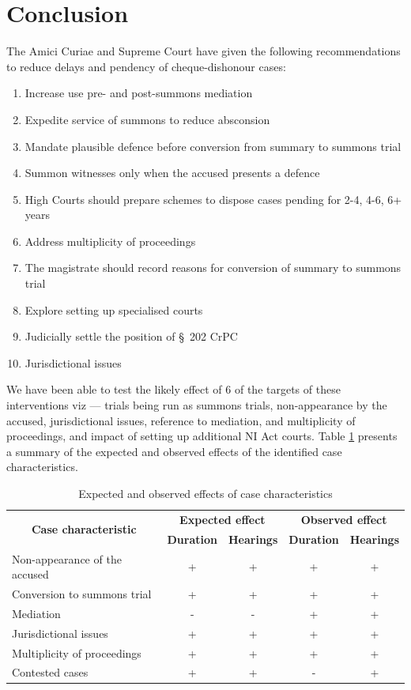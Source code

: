 \documentclass[12pt,a4paper]{article}
\begin{document}
\section{Conclusion}
\label{sec:conclusion}
The Amici Curiae and Supreme Court have given the following recommendations to reduce delays and pendency of cheque-dishonour cases:
\begin{enumerate}
\item Increase use pre- and post-summons mediation
\item Expedite service of summons to reduce absconsion
\item Mandate plausible defence before conversion from summary to summons trial
\item Summon witnesses only when the accused presents a defence
\item High Courts should prepare schemes to dispose cases pending for 2-4, 4-6, 6+ years
\item Address multiplicity of proceedings
\item The magistrate should record reasons for conversion of summary to summons trial
\item Explore setting up specialised courts
\item Judicially settle the position of \S~202 CrPC
\item Jurisdictional issues
\end{enumerate}

We have been able to test the likely effect of 6 of the targets of these interventions viz --- trials being run as summons trials, non-appearance by the accused, jurisdictional issues, reference to mediation, and multiplicity of proceedings, and impact of setting up additional NI Act courts. Table \ref{tab:observed} presents a summary of the expected and observed effects of the identified case characteristics.

\begin{longtable}{@{}lcc|cc@{}}
\caption{Expected and observed effects of case characteristics}
\label{tab:observed}\\
\toprule
\multicolumn{1}{c}{\multirow{2}{*}{\textbf{Case characteristic}}} & \multicolumn{2}{c}{\textbf{Expected effect}} & \multicolumn{2}{c}{\textbf{Observed effect}} \\ \cmidrule(l){2-5}
\multicolumn{1}{c}{} & \textbf{Duration} & \textbf{Hearings} & \textbf{Duration} & \textbf{Hearings}\\ \midrule
Non-appearance of the accused & + & + & + & + \\
Conversion to summons trial & + & + & + & +\\
Mediation & - & - & + & + \\
Jurisdictional issues & + & + & + & + \\
Multiplicity of proceedings & + & + & + & +\\
Contested cases & + & + & - & +\\ \bottomrule
\end{longtable}
\end{document}
